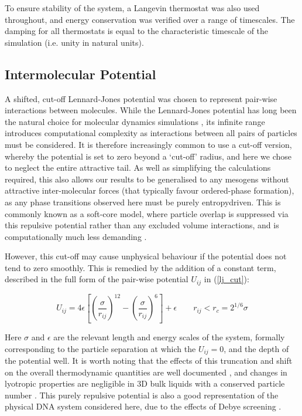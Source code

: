 \documentclass[11pt, a4paper]{article} %
\begin{document}
To ensure stability of the system, a Langevin thermostat \cite{Schneider1978} was also used throughout, and energy conservation was verified over a range of timescales. The damping for all thermostats is equal to the characteristic timescale of the simulation (i.e. unity in natural units).



\subsection{Intermolecular Potential} \label{pair_potential}
A shifted, cut-off Lennard-Jones potential was chosen to represent pair-wise interactions between molecules. While the Lennard-Jones potential \cite{Jones1924a, Jones1924b} has long been the natural choice for molecular dynamics simulations \cite{Stephan2019}, its infinite range introduces computational complexity as interactions between all pairs of particles must be considered. It is therefore increasingly common to use a cut-off version, whereby the potential is set to zero beyond a `cut-off' radius, and here we chose to neglect the entire attractive tail. As well as simplifying the calculations required, this also allows our results to be generalised to any mesogens without attractive inter-molecular forces (that typically favour ordered-phase formation), as any phase transitions observed here must be purely entropy\textendash driven. This is commonly known as a soft-core model, where particle overlap is suppressed via this repulsive potential rather than any excluded volume interactions, and is computationally much less demanding \cite{Paolini1993, Hughes2008}.

However, this cut-off may cause unphysical behaviour if the potential does not tend to zero smoothly. This is remedied by the addition of a constant term, described in the full form of the pair-wise potential $U_{ij}$ in (\ref{lj_cut}):

\begin{equation} \label{lj_cut}
U_{ij} = 4\epsilon \left[ \left( \frac{\sigma}{r_{ij}} \right) ^{12} - \left( \frac{\sigma}{r_{ij}} \right) ^{6}	\right] + \epsilon \qquad	 r_{ij} < r_{c} = 2^{1/6} \sigma
\end{equation}

Here $\sigma$ and $\epsilon$ are the relevant length and energy scales of the system, formally corresponding to the particle separation at which the $U_{ij} = 0$, and the depth of the potential well. It is worth noting that the effects of this truncation and shift on the overall thermodynamic quantities are well documented \cite{Stephan2020, Shaul2010}, and changes in lyotropic properties are negligible in 3D bulk liquids with a conserved particle number \cite{Smit1991}. This purely repulsive potential is also a good representation of the physical DNA system considered here, due to the effects of Debye screening \cite{Strey1997, Strey1998}.
\end{document}
